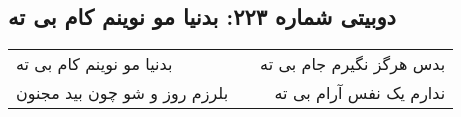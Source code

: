 \begin{center}
\section*{دوبیتی شماره ۲۲۳: بدنیا مو نوینم کام بی ته}
\label{sec:223}
\begin{longtable}{l p{0.5cm} r}
بدنیا مو نوینم کام بی ته
&&
بدس هرگز نگیرم جام بی ته
\\
بلرزم روز و شو چون بید مجنون
&&
ندارم یک نفس آرام بی ته
\\
\end{longtable}
\end{center}
